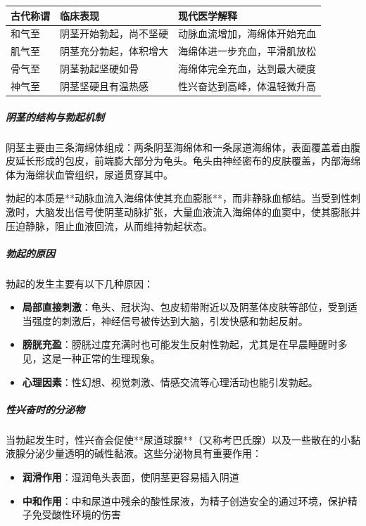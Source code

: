 \begin{center}
\begin{tabular}{p{3cm} p{5cm} p{4cm}}
\toprule
\textbf{古代称谓} & \textbf{临床表现} & \textbf{现代医学解释} \\
\midrule
和气至 & 阴茎开始勃起，尚不坚硬 & 动脉血流增加，海绵体开始充血 \\
肌气至 & 阴茎充分勃起，体积增大 & 海绵体进一步充血，平滑肌放松 \\
骨气至 & 阴茎勃起坚硬如骨 & 海绵体完全充血，达到最大硬度 \\
神气至 & 阴茎坚硬且有温热感 & 性兴奋达到高峰，体温轻微升高 \\
\bottomrule
\end{tabular}
\end{center}

\subparagraph{阴茎的结构与勃起机制}

阴茎主要由三条海绵体组成：两条阴茎海绵体和一条尿道海绵体，表面覆盖着由腹皮延长形成的包皮，前端膨大部分为龟头。龟头由神经密布的皮肤覆盖，内部海绵体为海绵状血管组织，尿道贯穿其中。

勃起的本质是**动脉血流入海绵体使其充血膨胀**，而非静脉血郁结。当受到性刺激时，大脑发出信号使阴茎动脉扩张，大量血液流入海绵体的血窦中，使其膨胀并压迫静脉，阻止血液回流，从而维持勃起状态。

\subparagraph{勃起的原因}

勃起的发生主要有以下几种原因：
\begin{itemize}
    \item \textbf{局部直接刺激}：龟头、冠状沟、包皮韧带附近以及阴茎体皮肤等部位，受到适当强度的刺激后，神经信号被传达到大脑，引发快感和勃起反射。
    \item \textbf{膀胱充盈}：膀胱过度充满时也可能发生反射性勃起，尤其是在早晨睡醒时多见，这是一种正常的生理现象。
    \item \textbf{心理因素}：性幻想、视觉刺激、情感交流等心理活动也能引发勃起。
\end{itemize}

\subparagraph{性兴奋时的分泌物}

当勃起发生时，性兴奋会促使**尿道球腺**（又称考巴氏腺）以及一些散在的小黏液腺分泌少量透明的碱性黏液。这些分泌物具有重要作用：
\begin{itemize}
    \item \textbf{润滑作用}：湿润龟头表面，使阴茎更容易插入阴道
    \item \textbf{中和作用}：中和尿道中残余的酸性尿液，为精子创造安全的通过环境，保护精子免受酸性环境的伤害
\end{itemize}

